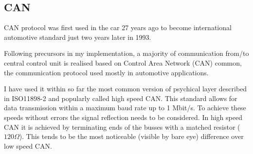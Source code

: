 \subsection{CAN}
CAN protocol was first used in the car 27 years ago to become international automotive standard just two years later in 1993.\cite{CAN_merc, CAN_1993}

\noindent
Following precursors in my implementation, a majority of communication from/to central control unit is realised based on Control Area Network (CAN) common, the communication protocol used mostly in automotive applications. 

I have used it within so far the most common version of psychical layer described in ISO11898-2 and popularly called high speed CAN. This standard allows for data transmission within a maximum baud rate up to 1 Mbit/s. To achieve these speeds without errors the signal reflection needs to be considered. In high speed CAN it is achieved by terminating ends of the busses with a matched resistor ($120\Omega$). This tends to be the most noticeable (visible by bare eye) difference over low speed CAN.

